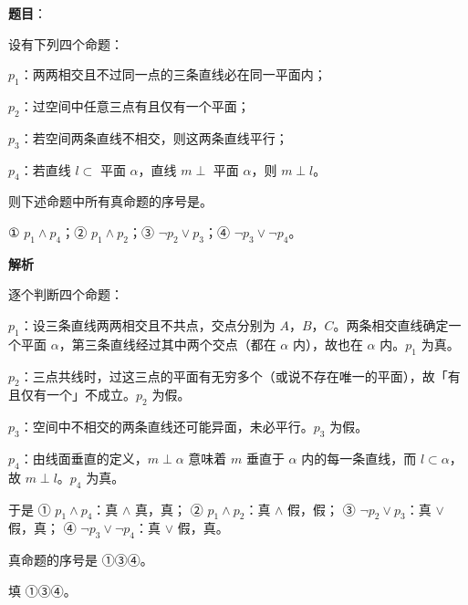 \begin{answer}

\textbf{题目}：

设有下列四个命题：

$p_1$：两两相交且不过同一点的三条直线必在同一平面内；

$p_2$：过空间中任意三点有且仅有一个平面；

$p_3$：若空间两条直线不相交，则这两条直线平行；

$p_4$：若直线 $l\subset$ 平面 $\alpha$，直线 $m\perp$ 平面 $\alpha$，则 $m\perp l$。

则下述命题中所有真命题的序号是\gkblank{}。

① $p_1\wedge p_4$；② $p_1\wedge p_2$；③ $\neg p_2\vee p_3$；④ $\neg p_3\vee\neg p_4$。

\textbf{解析}

逐个判断四个命题：

$p_1$：设三条直线两两相交且不共点，交点分别为 $A$，$B$，$C$。两条相交直线确定一个平面 $\alpha$，第三条直线经过其中两个交点（都在 $\alpha$ 内），故也在 $\alpha$ 内。$p_1$ 为真。

$p_2$：三点共线时，过这三点的平面有无穷多个（或说不存在唯一的平面），故「有且仅有一个」不成立。$p_2$ 为假。

$p_3$：空间中不相交的两条直线还可能异面，未必平行。$p_3$ 为假。

$p_4$：由线面垂直的定义，$m\perp\alpha$ 意味着 $m$ 垂直于 $\alpha$ 内的每一条直线，而 $l\subset\alpha$，故 $m\perp l$。$p_4$ 为真。

于是
① $p_1\wedge p_4$：真 $\wedge$ 真，真；
② $p_1\wedge p_2$：真 $\wedge$ 假，假；
③ $\neg p_2\vee p_3$：真 $\vee$ 假，真；
④ $\neg p_3\vee\neg p_4$：真 $\vee$ 假，真。

真命题的序号是 ①③④。

填 ①③④。


\end{answer}
